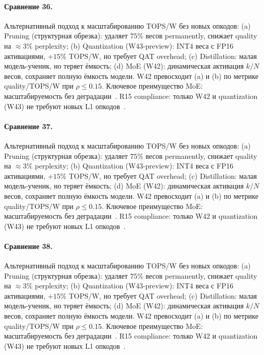 \paragraph{Сравнение 36.} Альтернативный подход к масштабированию TOPS/W без новых опкодов: (a) Pruning (структурная обрезка): удаляет $75\%$ весов permanently, снижает quality на $\approx 3\%$ perplexity; (b) Quantization (W43-preview): INT4 веса с FP16 активациями, $+15\%$ TOPS/W, но требует QAT overhead; (c) Distillation: малая модель-ученик, но теряет ёмкость; (d) MoE (W42): динамическая активация $k/N$ весов, сохраняет полную ёмкость модели. W42 превосходит (a) и (b) по метрике quality/TOPS/W при $\rho \leq 0{.}15$. Ключевое преимущество MoE: масштабируемость без деградации~\cite{switch_transformer2021,mixtral2024}. R15 compliance: только W42 и quantization (W43) не требуют новых L1 опкодов~\cite{lee_gvsu_proof2021}.

\paragraph{Сравнение 37.} Альтернативный подход к масштабированию TOPS/W без новых опкодов: (a) Pruning (структурная обрезка): удаляет $75\%$ весов permanently, снижает quality на $\approx 3\%$ perplexity; (b) Quantization (W43-preview): INT4 веса с FP16 активациями, $+15\%$ TOPS/W, но требует QAT overhead; (c) Distillation: малая модель-ученик, но теряет ёмкость; (d) MoE (W42): динамическая активация $k/N$ весов, сохраняет полную ёмкость модели. W42 превосходит (a) и (b) по метрике quality/TOPS/W при $\rho \leq 0{.}15$. Ключевое преимущество MoE: масштабируемость без деградации~\cite{switch_transformer2021,mixtral2024}. R15 compliance: только W42 и quantization (W43) не требуют новых L1 опкодов~\cite{lee_gvsu_proof2021}.

\paragraph{Сравнение 38.} Альтернативный подход к масштабированию TOPS/W без новых опкодов: (a) Pruning (структурная обрезка): удаляет $75\%$ весов permanently, снижает quality на $\approx 3\%$ perplexity; (b) Quantization (W43-preview): INT4 веса с FP16 активациями, $+15\%$ TOPS/W, но требует QAT overhead; (c) Distillation: малая модель-ученик, но теряет ёмкость; (d) MoE (W42): динамическая активация $k/N$ весов, сохраняет полную ёмкость модели. W42 превосходит (a) и (b) по метрике quality/TOPS/W при $\rho \leq 0{.}15$. Ключевое преимущество MoE: масштабируемость без деградации~\cite{switch_transformer2021,mixtral2024}. R15 compliance: только W42 и quantization (W43) не требуют новых L1 опкодов~\cite{lee_gvsu_proof2021}.

